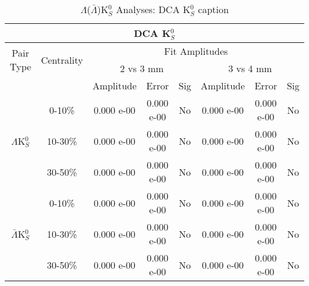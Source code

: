 \documentclass[../AnalysisNoteJBuxton.tex]{subfiles}
\begin{document}
\begin{table}
 \centering
 \begin{tabular}{|c|c|c|c|c||c|c|c|}
  \multicolumn{8}{c}{DCA K$^{0}_{S}$} \\
  \hline
  \multirow{2}{*}{Pair Type} & \multirow{2}{*}{Centrality} & \multicolumn{6}{c|}{Fit Amplitudes} \\
  \cline{3-8}
   & & \multicolumn{3}{c||}{2 vs 3 mm} & \multicolumn{3}{c|}{3 vs 4 mm} \\
  \hline
   & & Amplitude & Error & Sig & Amplitude & Error & Sig \\
  \hline  
  \multirow{3}{*}{$\Lambda$K$^{0}_{S}$}  
   &  0-10\% & 0.000 e-00 & 0.000 e-00 & No & 0.000 e-00 & 0.000 e-00 & No \\
   & 10-30\% & 0.000 e-00 & 0.000 e-00 & No & 0.000 e-00 & 0.000 e-00 & No \\
   & 30-50\% & 0.000 e-00 & 0.000 e-00 & No & 0.000 e-00 & 0.000 e-00 & No \\
  \hline  
  \multirow{3}{*}{$\bar{\Lambda}$K$^{0}_{S}$}  
   &  0-10\% & 0.000 e-00 & 0.000 e-00 & No & 0.000 e-00 & 0.000 e-00 & No \\
   & 10-30\% & 0.000 e-00 & 0.000 e-00 & No & 0.000 e-00 & 0.000 e-00 & No \\
   & 30-50\% & 0.000 e-00 & 0.000 e-00 & No & 0.000 e-00 & 0.000 e-00 & No \\
  \hline
 \end{tabular}
 \caption{$\Lambda$($\bar{\Lambda}$)K$^{0}_{S}$ Analyses: DCA K$^{0}_{S}$ caption}
 \label{tab:K0DcaLamK0}
\end{table}
\end{document}
